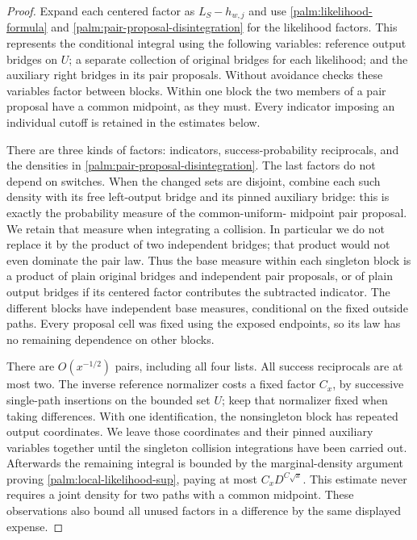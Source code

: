 \begin{proof}
Expand each centered factor as $L_S-h_{w,j}$ and use
\eqref{palm:likelihood-formula} and
\eqref{palm:pair-proposal-disintegration} for the likelihood factors.
This represents the conditional integral using the following variables:
reference output bridges on $U$; a separate collection of original
bridges for each likelihood; and the auxiliary right bridges in its
pair proposals.  Without avoidance checks these variables factor
between blocks.  Within one block the two members of a pair proposal
have a common midpoint, as they must.  Every indicator imposing an
individual cutoff is retained in the estimates below.

There are three kinds of factors: indicators, success-probability
reciprocals, and the densities in
\eqref{palm:pair-proposal-disintegration}.  The last factors do not
depend on switches.  When the changed sets are disjoint, combine each
such density with its free left-output bridge and its pinned auxiliary
bridge: this is exactly the probability measure of the common-uniform-
midpoint pair proposal.  We retain that measure when integrating a
collision.  In particular we do not replace it by the product of two
independent bridges; that product would not even dominate the pair law.
Thus the base measure within each singleton block is a product of plain
original bridges and independent pair proposals, or of plain output
bridges if its centered factor contributes the subtracted indicator.
The different blocks have independent base measures, conditional on the
fixed outside paths.  Every proposal cell was fixed using the exposed
endpoints, so its law has no remaining dependence on other blocks.

There are $O(x^{-1/2})$ pairs, including all four lists.  All success
reciprocals are at most two.  The inverse reference normalizer costs a
fixed factor $C_x$, by successive single-path insertions on the bounded
set $U$; keep that normalizer fixed when taking differences.  With one
identification, the nonsingleton block has repeated output coordinates.
We leave those coordinates and their pinned auxiliary variables together
until the singleton collision integrations have been carried out.
Afterwards the remaining integral is bounded by the marginal-density
argument proving \eqref{palm:local-likelihood-sup}, paying at most
$C_xD^{C\sqrt x}$.  This estimate never requires a joint density for
two paths with a common midpoint.  These observations also bound all
unused factors in a difference by the same displayed expense.


\end{proof}
